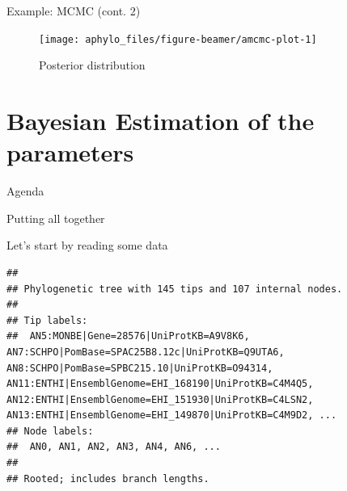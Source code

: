 \documentclass[9pt,handout,ignorenonframetext,]{beamer}
\newenvironment{Shaded}{\begin{snugshade}}{\end{snugshade}}
\newcommand{\KeywordTok}[1]{\textcolor[rgb]{0.94,0.87,0.69}{#1}}
\newcommand{\DataTypeTok}[1]{\textcolor[rgb]{0.87,0.87,0.75}{#1}}
\newcommand{\StringTok}[1]{\textcolor[rgb]{0.80,0.58,0.58}{#1}}
\newcommand{\CommentTok}[1]{\textcolor[rgb]{0.50,0.62,0.50}{#1}}
\newcommand{\OperatorTok}[1]{\textcolor[rgb]{0.94,0.94,0.82}{#1}}
\newcommand{\NormalTok}[1]{\textcolor[rgb]{0.80,0.80,0.80}{#1}}
\begin{document}
\begin{frame}[t]{Example: MCMC (cont. 2)}

\footnotesize

\begin{figure}

{\centering \texttt{[image: aphylo\_files/figure-beamer/amcmc-plot-1]} 

}

\caption{Posterior distribution}\label{fig:amcmc-plot}
\end{figure}

\normalsize

\end{frame}

\section{Bayesian Estimation of the
parameters}\label{bayesian-estimation-of-the-parameters}

\begin{frame}[t]{Agenda}

\tableofcontents[currentsection]

\end{frame}

\begin{frame}[fragile]{Putting all together}

Let's start by reading some data

\footnotesize

\begin{Shaded}
\end{Shaded}

\begin{verbatim}
## 
## Phylogenetic tree with 145 tips and 107 internal nodes.
## 
## Tip labels:
##  AN5:MONBE|Gene=28576|UniProtKB=A9V8K6, AN7:SCHPO|PomBase=SPAC25B8.12c|UniProtKB=Q9UTA6, AN8:SCHPO|PomBase=SPBC215.10|UniProtKB=O94314, AN11:ENTHI|EnsemblGenome=EHI_168190|UniProtKB=C4M4Q5, AN12:ENTHI|EnsemblGenome=EHI_151930|UniProtKB=C4LSN2, AN13:ENTHI|EnsemblGenome=EHI_149870|UniProtKB=C4M9D2, ...
## Node labels:
##  AN0, AN1, AN2, AN3, AN4, AN6, ...
## 
## Rooted; includes branch lengths.
\end{verbatim}

\normalsize

\end{frame}
\end{document}
